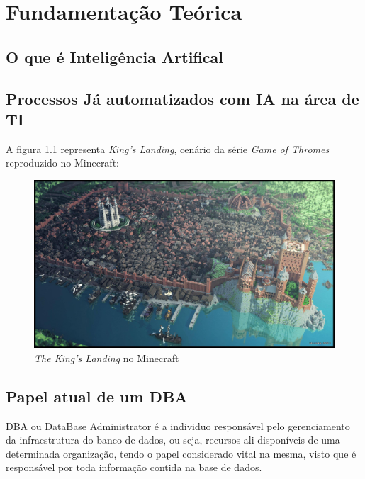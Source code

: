 \chapter{Fundamentação Teórica}

\lipsum[1-2]

\begin{citacao}
\lipsum[1]\cite[p. ~34]{Huizinga2014}
\end{citacao}

\section{O que é Inteligência Artifical}


\lipsum[4-7]

\section{Processos Já automatizados com IA na área de TI}

\lipsum[8-9]

A figura \ref{fig:kings-landing} representa \emph{King's Landing}, cenário da série \emph{Game of Thromes} reproduzido no Minecraft:

\begin{figure}[h]
	\caption{\emph{The King's Landing} no Minecraft}
	\center
	\label{fig:kings-landing}
	\includegraphics[scale=0.15]{fundamentacao/kings-landing.jpg}
\end{figure}

\lipsum[10-12]

\section{Papel atual de um DBA}

DBA ou DataBase Administrator é a individuo responsável pelo gerenciamento da infraestrutura do banco de dados, ou seja, recursos ali disponíveis de uma determinada organização, tendo o papel considerado vital na mesma, visto que é responsável por toda informação contida na base de dados.



